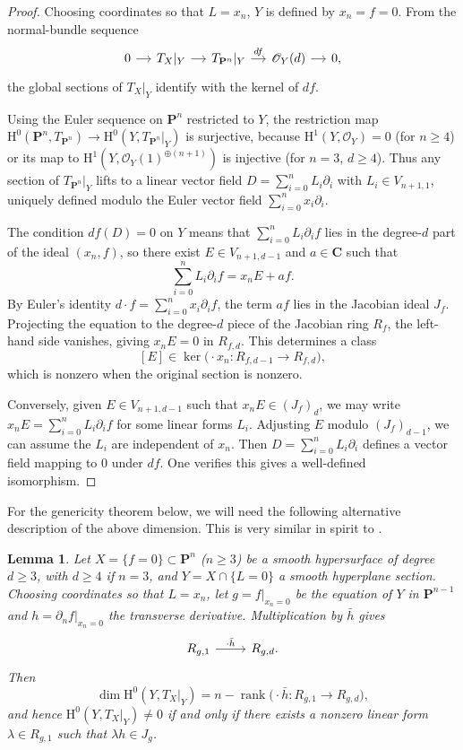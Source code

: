\documentclass[a4paper,12pt,twoside,reqno]{amsart}
\numberwithin{equation}{section}
\theoremstyle{plain}
\newtheorem{lemma}[theorem]{Lemma}
\theoremstyle{definition}
\DeclareMathOperator{\rank}{rank}
\newcommand{\PP}{\mathbf{P}}
\newcommand{\CC}{\mathbf{C}}
\newcommand{\Oc}{\mathscr{O}}
\newcommand{\HH}{\mathrm{H}}
\theoremstyle{plain}
\theoremstyle{definition}
\begin{document}
\begin{proof}
Choosing coordinates so that $L=x_n$, $Y$ is defined by $x_n=f=0$. From the normal-bundle sequence
\[
\begin{tikzcd}[column sep=small]
0 \arrow[r] & T_X|_Y \arrow[r] & T_{\PP^n}|_Y
\arrow[r, "df"] & \Oc_Y(d) \arrow[r] & 0,
\end{tikzcd}
\]
the global sections of $T_X|_Y$ identify with the kernel of $df$.

Using the Euler sequence on $\PP^n$ restricted to $Y$, the restriction map $\HH^0(\PP^n,T_{\PP^n})\to\HH^0(Y,T_{\PP^n}|_Y)$ is surjective, because $\HH^1(Y,\Oc_Y)=0$ (for $n\ge4$) or its map to $\HH^1(Y,\Oc_Y(1)^{\oplus(n+1)})$ is injective (for $n=3$, $d\ge4$). Thus any section of $T_{\PP^n}|_Y$ lifts to a linear vector field $D=\sum_{i=0}^n L_i\partial_i$ with $L_i\in V_{n+1,1}$, uniquely defined modulo the Euler vector field $\sum_{i=0}^n x_i\partial_i$.

The condition $df(D)=0$ on $Y$ means that $\sum_{i=0}^n L_i\partial_i f$ lies in the degree-$d$ part of the ideal $(x_n,f)$, so there exist $E\in V_{n+1,d-1}$ and $a\in\CC$ such that
\[
   \sum_{i=0}^n L_i\partial_i f = x_n E + af.
\]
By Euler's identity $d\cdot f=\sum_{i=0}^n x_i\partial_i f$, the term $af$ lies in the Jacobian ideal $J_f$. Projecting the equation to the degree-$d$ piece of the Jacobian ring $R_f$, the left-hand side vanishes, giving $x_n E=0$ in $R_{f,d}$. This determines a class
\[
[E]\in\ker\bigl(\cdot x_n\colon R_{f,d-1}\to R_{f,d}\bigr),
\]
which is nonzero when the original section is nonzero.

Conversely, given $E\in V_{n+1,d-1}$ such that $x_n E\in (J_f)_d$, we may write $x_n E=\sum_{i=0}^n L_i\partial_i f$ for some linear forms $L_i$. Adjusting $E$ modulo $(J_f)_{d-1}$, we can assume the $L_i$ are independent of $x_n$. Then $D=\sum_{i=0}^n L_i\partial_i$ defines a vector field mapping to $0$ under $df$. One verifies this gives a well-defined isomorphism.
\end{proof}


For the genericity theorem below, we will need the following alternative description of the above dimension. This is very similar in spirit to \cite[Proposition~3.1]{IlardiNasrollahTafazolian}.

\begin{lemma}\label{lem:criterion}
Let $X=\{f=0\}\subset\PP^n$ ($n\ge3$) be a smooth hypersurface of degree $d\ge3$, with $d\ge4$ if $n=3$, and $Y=X\cap\{L=0\}$ a smooth hyperplane section. Choosing coordinates so that $L=x_n$, let $g=f|_{x_n=0}$ be the equation of $Y$ in $\PP^{n-1}$ and $h=\partial_n f|_{x_n=0}$ the transverse derivative. Multiplication by $\bar h$ gives
\[
\begin{tikzcd}
R_{g,1} \arrow[r, "\cdot\bar h"] & R_{g,d}.
\end{tikzcd}
\]
Then
\[
\dim\HH^0(Y,T_X|_Y)
=n-\rank\bigl(\cdot\bar h\colon R_{g,1}\to R_{g,d}\bigr),
\]
and hence $\HH^0(Y,T_X|_Y)\neq0$ if and only if there exists a nonzero linear form $\lambda\in R_{g,1}$ such that $\lambda h\in J_{g}$. 
\end{lemma}
\end{document}
